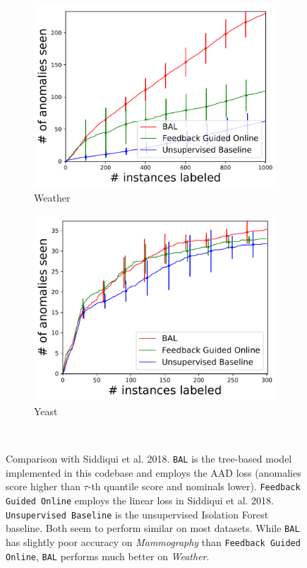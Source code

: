 \documentclass{article} %
\begin{document}
\begin{figure}[h]
\begin{subfigure}[b]{0.23\textwidth}
		\includegraphics[width=\textwidth]{fbonline/num_seen-weather.pdf}
		\caption{Weather}
		\label{fig:angles_weather}
	\end{subfigure}
	\begin{subfigure}[b]{0.23\textwidth}
		\includegraphics[width=\textwidth]{fbonline/num_seen-yeast.pdf}
		\caption{Yeast}
		\label{fig:angles_yeast}
	\end{subfigure} \\[-1ex]
	\caption{Comparison with Siddiqui et al. 2018. \texttt{BAL} is the tree-based model implemented in this codebase and employs the AAD loss (anomalies score higher than $\tau$-th quantile score and nominals lower). \texttt{Feedback Guided Online} employs the linear loss in Siddiqui et al. 2018. \texttt{Unsupervised Baseline} is the unsupervised Isolation Forest baseline. Both seem to perform similar on most datasets. While \texttt{BAL} has slightly poor accuracy on \textit{Mammography} than \texttt{Feedback Guided Online}, \texttt{BAL} performs much better on \textit{Weather}.}
	\label{fig:fbonline_all}
\end{figure}
\end{document}
